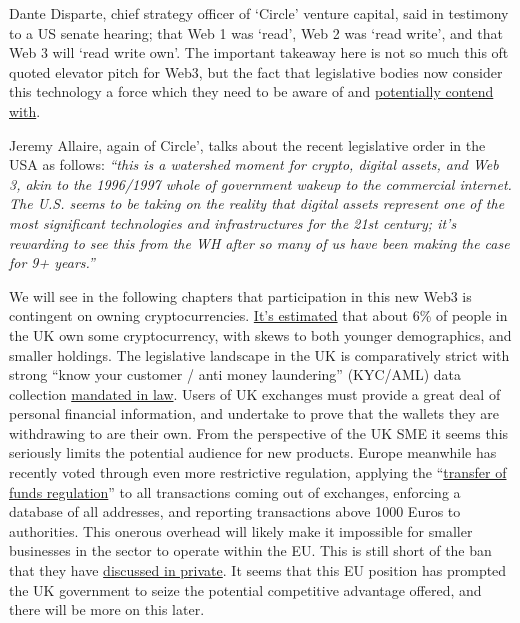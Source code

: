 Dante Disparte, chief strategy officer of `Circle' venture capital, said in testimony to a US senate hearing; that Web 1 was `read', Web 2 was `read write', and that Web 3 will `read write own'. The important takeaway here is not so much this oft quoted elevator pitch for Web3, but the fact that legislative bodies now consider this technology a force which they need to be aware of and \href{https://a16z.com/2021/12/17/prediction-for-the-new-year-a-web3-midterm/}{potentially contend with}.\par
Jeremy Allaire, again of Circle', talks about the recent legislative order in the USA as follows:
\textit{``this is a watershed moment for crypto, digital assets, and Web 3, akin to the 1996/1997 whole of government wakeup to the commercial internet. The U.S. seems to be taking on the reality that digital assets represent one of the most significant technologies and infrastructures for the 21st century; it's rewarding to see this from the WH after so many of us have been making the case for 9+ years.''}\par
We will see in the following chapters that participation in this new Web3 is contingent on owning cryptocurrencies. \href{https://www.finder.com/uk/cryptocurrency-statistics}{It's estimated} that about 6\% of people in the UK own some cryptocurrency, with skews to both younger demographics, and smaller holdings. The legislative landscape in the UK is comparatively strict with strong ``know your customer / anti money laundering'' (KYC/AML) data collection \href{https://www.gov.uk/guidance/money-laundering-regulations-your-responsibilities}{mandated in law}. Users of UK exchanges must provide a great deal of personal financial information, and undertake to prove that the wallets they are withdrawing to are their own. From the perspective of the UK SME it seems this seriously limits the potential audience for new products. Europe meanwhile has recently voted through even more restrictive regulation, applying the ``\href{https://www.europarl.europa.eu/legislative-train/theme-an-economy-that-works-for-people/file-revision-of-the-regulation-on-transfers-of-funds}{transfer of funds regulation}'' to all transactions coming out of exchanges, enforcing a database of all addresses, and reporting transactions above 1000 Euros to authorities. This onerous overhead will likely make it impossible for smaller businesses in the sector to operate within the EU. This is still short of the ban that they have \href{https://netzpolitik.org/2022/climate-measures-behind-closed-doors-eu-officials-talk-about-banning-bitcoin/}{discussed in private}. It seems that this EU position has prompted the UK government to seize the potential competitive advantage offered, and there will be more on this later.\par
